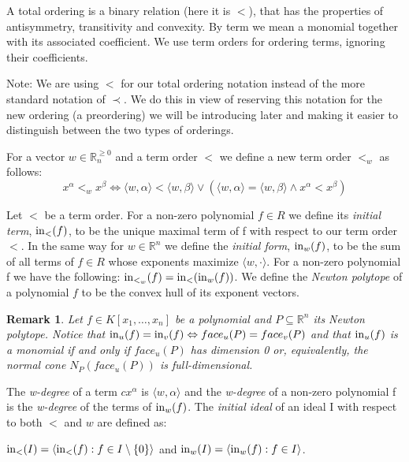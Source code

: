 \documentclass[12pt,a4paper]{report}
\newtheorem{remark}{Remark}
\begin{document}
A total ordering is a binary relation (here it is $<$), that has the properties of antisymmetry, transitivity and convexity. By term we mean a monomial together with its associated coefficient. We use term orders for ordering terms, ignoring their coefficients. 

Note: We are using $<$ for our total ordering notation instead of the more standard notation of $\prec$. We do this in view of reserving this notation for the new ordering (a preordering) we will be introducing later and making it easier to distinguish between the two types of orderings.


For a vector $w \in \mathbb{R}_{n} ^ {\geq 0}$ and a term order $<$ we define a new term order $<_{w}$ as follows:
\begin{equation*}
    x^{\alpha} <_{w} x^{\beta} \Leftrightarrow \langle w, \alpha \rangle < \langle w, \beta \rangle \vee (\langle w, \alpha \rangle = \langle w, \beta \rangle \wedge x^{\alpha} < x^{\beta})
\end{equation*}

Let $<$ be a term order. For a non-zero polynomial $f \in R$ we define its \emph{initial term}, $\operatorname{in}_{<} (f)$, to be the unique maximal term of f with respect to our term order $<$. In the same way for $w \in \mathbb R^{n}$ we define the \emph{initial form}, $\operatorname{in}_{w} (f)$, to be the sum of all terms of $f \in R$ whose exponents maximize $\langle w, \cdot \rangle$. For a non-zero polynomial f we have the following: $\operatorname{in}_{{<}_{w}} (f) = \operatorname{in}_{<} (\operatorname{in}_{w} (f))$. We define the \emph{Newton polytope} of a polynomial $f$ to be the convex hull of its exponent vectors.

\begin{remark}
Let $f \in K[x_{1}, \ldots ,x_{n}]$ be a polynomial and $P \subseteq \mathbb R^{n}$ its Newton polytope. Notice that $\operatorname{in}_{u} (f) = \operatorname{in}_{v} (f) \Leftrightarrow face_{u} (P) = face_{v} (P)$ and that $\operatorname{in}_{u} (f)$ is a monomial if and only if $face_{u} (P)$ has dimension 0 or, equivalently, the normal cone $N_{P} (face_{u} (P))$ is full-dimensional.
\end{remark}

The \emph{w-degree} of a term $cx^{\alpha}$ is $\langle w, \alpha \rangle$ and the \emph{w-degree} of a non-zero polynomial f is the \emph{w-degree} of the terms of $\operatorname{in}_{w} (f)$. The \emph{initial ideal} of an ideal I with respect to both $<$ and $w$ are defined as:


$\operatorname{in}_{<} (I) = \langle \operatorname{in}_{<} (f): f \in I \setminus \{0 \} \rangle$ and $\operatorname{in}_{w} (I) = \langle \operatorname{in}_{w} (f): f \in I \rangle$.
\end{document}
